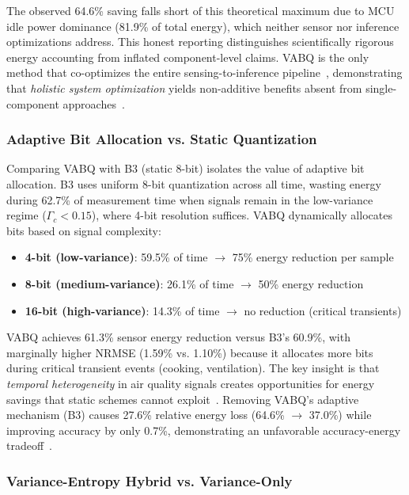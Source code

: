 The observed 64.6\% saving falls short of this theoretical maximum due to MCU idle power dominance (81.9\% of total energy), which neither sensor nor inference optimizations address. This honest reporting distinguishes scientifically rigorous energy accounting from inflated component-level claims. VABQ is the only method that co-optimizes the entire sensing-to-inference pipeline~\cite{edgemlops2025, energycompounding2024}, demonstrating that \textit{holistic system optimization} yields non-additive benefits absent from single-component approaches~\cite{edgempq2024}.

\subsubsection{Adaptive Bit Allocation vs. Static Quantization}

Comparing VABQ with B3 (static 8-bit) isolates the value of adaptive bit allocation. B3 uses uniform 8-bit quantization across all time, wasting energy during 62.7\% of measurement time when signals remain in the low-variance regime ($\Gamma_c < 0.15$), where 4-bit resolution suffices. VABQ dynamically allocates bits based on signal complexity:

\begin{itemize}
    \item \textbf{4-bit (low-variance)}: 59.5\% of time $\rightarrow$ 75\% energy reduction per sample
    \item \textbf{8-bit (medium-variance)}: 26.1\% of time $\rightarrow$ 50\% energy reduction
    \item \textbf{16-bit (high-variance)}: 14.3\% of time $\rightarrow$ no reduction (critical transients)
\end{itemize}

VABQ achieves 61.3\% sensor energy reduction versus B3's 60.9\%, with marginally higher NRMSE (1.59\% vs. 1.10\%) because it allocates more bits during critical transient events (cooking, ventilation). The key insight is that \textit{temporal heterogeneity} in air quality signals creates opportunities for energy savings that static schemes cannot exploit~\cite{atitallah2023autonomous}. Removing VABQ's adaptive mechanism (B3) causes 27.6\% relative energy loss (64.6\% $\rightarrow$ 37.0\%) while improving accuracy by only 0.7\%, demonstrating an unfavorable accuracy-energy tradeoff~\cite{energyefficiency2024}.

\subsubsection{Variance-Entropy Hybrid vs. Variance-Only}

